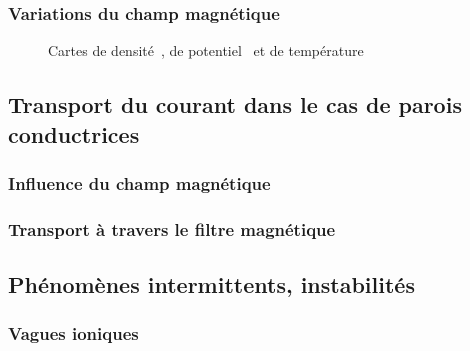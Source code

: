 \begin{refsection}
	\subsubsection{Variations du champ magnétique}
	\begin{figure}
  \centering
    \caption{Cartes de densité~, de
    potentiel~ et de
    température}
    \label{pandas}
\end{figure}
\subsection{Transport du courant dans le cas de parois conductrices}
	\subsubsection{Influence du champ magnétique}
	\subsubsection{Transport à travers le filtre magnétique}
\subsection{Phénomènes intermittents, instabilités}
	\subsubsection{Vagues ioniques}

\end{refsection}
